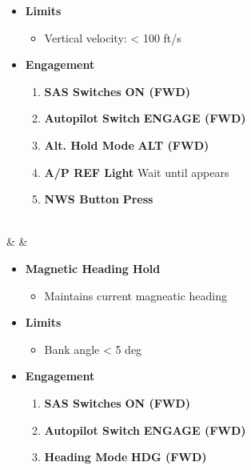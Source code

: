 \documentclass[fontInter]{TechCheck}
\begin{document}
\begin{listlongtable}
\begin{minipage}[t]{\linewidth}
\begin{itemize}
\begin{itemize}
				\end{itemize}
				\item \textbf{Limits}
				\begin{itemize}
					\item Vertical velocity: < 100 ft/s
				\end{itemize}
				\item \textbf{Engagement}
				\begin{enumerate}
					\item \textbf{SAS Switches} \dotfill \textbf{ON (FWD)}
					\item \textbf{Autopilot Switch} \dotfill \textbf{ENGAGE (FWD)}
					\item \textbf{Alt. Hold Mode} \dotfill \textbf{ALT (FWD)}
					\item \textbf{A/P REF Light} \dotfill Wait until appears
					\item \textbf{NWS Button} \dotfill \textbf{Press}
				\end{enumerate}
			\end{itemize}
		\end{minipage} \\
		\midrule
		\textbf{\textbf{\textbullet}} &  &
		\begin{minipage}[t]{\linewidth}
			\vspace{-7pt}
			\begin{itemize}
				\item \textbf{Magnetic Heading Hold}
				\begin{itemize}
					\item Maintains current magneatic heading
				\end{itemize}
				\item \textbf{Limits}
				\begin{itemize}
					\item Bank angle < 5 deg
				\end{itemize}
				\item \textbf{Engagement}
				\begin{enumerate}
					\item \textbf{SAS Switches} \dotfill \textbf{ON (FWD)}
					\item \textbf{Autopilot Switch} \dotfill \textbf{ENGAGE (FWD)}
					\item \textbf{Heading Mode} \dotfill \textbf{HDG (FWD)}
				\end{enumerate}
			\end{itemize}
		\end{minipage} \\

\end{listlongtable}
\end{document}

